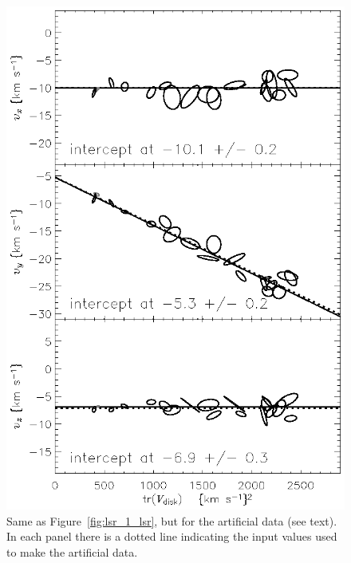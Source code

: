 \documentclass[12pt,preprint]{aastex}
\begin{document}
\clearpage
\begin{figure}
\includegraphics{lsr_1fake_lsr.ps}
\caption{Same as Figure~\ref{fig:lsr_1_lsr}, but for the artificial data
(see text).  In each panel there is a dotted line indicating the input
values used to make the artificial data.\label{fig:lsr_1fake_lsr}}
\end{figure}
\end{document}

